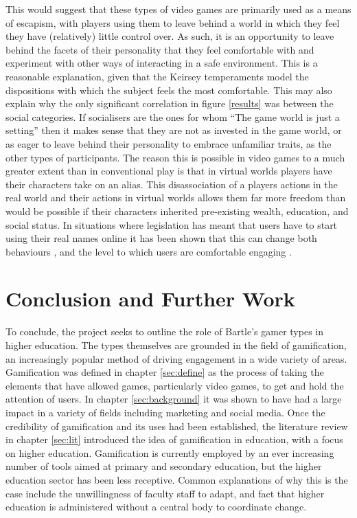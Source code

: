 \documentclass[12pt,a4paper,twoside]{report}
\begin{document}
This would suggest that these types of video games are primarily used as a means of escapism, with players using them to leave behind a world in which they feel they have (relatively) little control over. As such, it is an opportunity to leave behind the facets of their personality that they feel comfortable with and experiment with other ways of interacting in a safe environment. This is a reasonable explanation, given that the Keirsey temperaments model the dispositions with which the subject feels the most comfortable. This may also explain why the only significant correlation in figure \ref{results} was between the social categories. If socialisers are the ones for whom ``The game world is just a setting'' \cite{bartle1996hearts} then it makes sense that they are not as invested in the game world, or as eager to leave behind their personality to embrace unfamiliar traits, as the other types of participants. The reason this is possible in video games to a much greater extent than in conventional play is that in virtual worlds players have their characters take on an alias. This disassociation of a players actions in the real world and their actions in virtual worlds allows them far more freedom than would be possible if their characters inherited pre-existing wealth, education, and social status. In situations where legislation has meant that users have to start using their real names online it has been shown that this can change both behaviours \cite{cho2012empirical}, and the level to which users are comfortable engaging \cite{bellonline}.

\chapter{Conclusion and Further Work}
To conclude, the project seeks to outline the role of Bartle's gamer types in higher education. The types themselves are grounded in the field of gamification, an increasingly popular method of driving engagement in a wide variety of areas. Gamification was defined in chapter \ref{sec:define} as the process of taking the elements that have allowed games, particularly video games, to get and hold the attention of users. In chapter \ref{sec:background} it was shown to have had a large impact in a variety of fields including marketing and social media. Once the credibility of gamification and its uses had been established, the literature review in chapter \ref{sec:lit} introduced the idea of gamification in education, with a focus on higher education. Gamification is currently employed by an ever increasing number of tools aimed at primary and secondary education, but the higher education sector has been less receptive. Common explanations of why this is the case include the unwillingness of faculty staff to adapt, and fact that higher education is administered without a central body to coordinate change.
\end{document}
